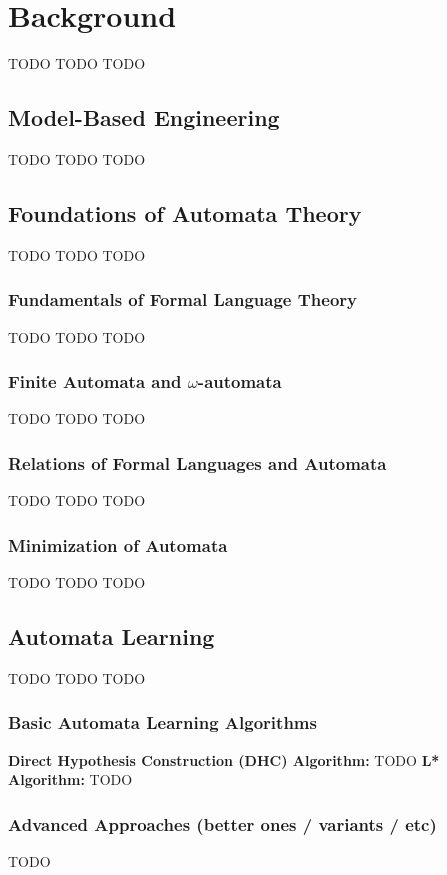\chapter{Background}
TODO TODO TODO

\section{Model-Based Engineering}
TODO TODO TODO

\section{Foundations of Automata Theory}
TODO TODO TODO

\subsection{Fundamentals of Formal Language Theory}
TODO TODO TODO

\subsection{Finite Automata and $\omega$-automata}
TODO TODO TODO

\subsection{Relations of Formal Languages and Automata}
TODO TODO TODO

\subsection{Minimization of Automata}
TODO TODO TODO


\section{Automata Learning}
TODO TODO TODO

\subsection{Basic Automata Learning Algorithms}
\textbf{Direct Hypothesis Construction (DHC) Algorithm:} TODO
\newline
\textbf{L* Algorithm:} TODO

\subsection{Advanced Approaches (better ones / variants / etc)}
TODO

